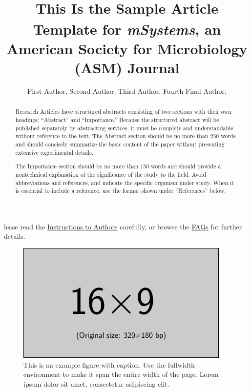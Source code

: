 \documentclass[lineno]{asm-article}
\title{This Is the Sample Article Template for \textit{mSystems}\textsuperscript{\textregistered}, an American Society for Microbiology (ASM) Journal}
\author{%
  First Author,\afn{a}
  Second Author,\afn{a,\authfn{2}}
  Third Author,\afn{b}
  Fourth Final Author,\afn{a,b,\authfn{1}}
}
\affil{%
  University Name, Faculty Group, Department, City, Country\afn{a};
  Company Name, City, Country\afn{b}
}
\begin{document}
\maketitle


\begin{abstract}
Research Articles have structured abstracts consisting of two sections with their own headings: ``Abstract'' and ``Importance.'' Because the structured abstract will be published separately by abstracting services, it must be complete and understandable without reference to the text. The Abstract section should be no more than 250 words and should  concisely  summarize  the  basic  content  of  the  paper without presenting extensive experimental details.

\begin{importance}
The Importance section should be no more than 150 words and should provide a nontechnical explanation of the significance of the study to the field. Avoid abbreviations and references, and indicate the specific organism under study. When it is essential to include a reference, use the format shown under ``References'' below.
\end{importance}

\end{abstract}


lease read the \href{https://journals.asm.org/journal/msystems/submission-review-process}{Instructions to Authors} carefully, or browse the \href{https://journals.asm.org/journal/msystems/faq}{FAQs} for further details.

\begin{figure}[tp!]
\begin{fullwidth}
\includegraphics[width=\linewidth]{example-image-16x9}
\caption{This is an example figure with caption. Use the fullwidth environment to make it span the entire width of the page. Lorem ipsum dolor sit amet, consectetur adipiscing elit.}
\label{fig:example}
\end{fullwidth}
\end{figure}
\end{document}
